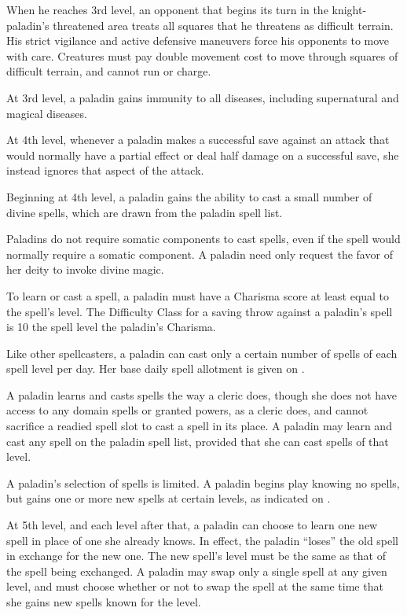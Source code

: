  When he reaches 3rd level, an opponent that begins its turn in the knight-paladin's threatened area treats all squares that he threatens as difficult terrain. His strict vigilance and active defensive maneuvers force his opponents to move with care. Creatures must pay double movement cost to move through squares of difficult terrain, and cannot run or charge.

 At 3rd level, a paladin gains immunity to all diseases, including supernatural and magical diseases.

 At 4th level, whenever a paladin makes a successful save against an attack that would normally have a partial effect or deal half damage on a successful save, she instead ignores that aspect of the attack.

 Beginning at 4th level, a paladin gains the ability to cast a small number of divine spells, which are drawn from the paladin spell list.

Paladins do not require somatic components to cast spells, even if the spell would normally require a somatic component. A paladin need only request the favor of her deity to invoke divine magic.

\par To learn or cast a spell, a paladin must have a Charisma score at least equal to the spell's level. The Difficulty Class for a saving throw against a paladin's spell is 10 \add the spell level \add the paladin's Charisma.

\par Like other spellcasters, a paladin can cast only a certain number of spells of each spell level per day. Her base daily spell allotment is given on .

A paladin learns and casts spells the way a cleric does, though she does not have access to any domain spells or granted powers, as a cleric does, and cannot sacrifice a readied spell slot to cast a  spell in its place. A paladin may learn and cast any spell on the paladin spell list, provided that she can cast spells of that level.

A paladin's selection of spells is limited. A paladin begins play knowing no spells, but gains one or more new spells at certain levels, as indicated on .

\par At 5th level, and each level after that, a paladin can choose to learn one new spell in place of one she already knows. In effect, the paladin ``loses'' the old spell in exchange for the new one. The new spell's level must be the same as that of the spell being exchanged. A paladin may swap only a single spell at any given level, and must choose whether or not to swap the spell at the same time that she gains new spells known for the level.

